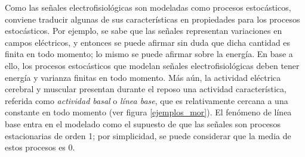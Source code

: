 %

%

Como las señales electrofisiológicas son modeladas como procesos estocásticos, conviene traducir algunas de sus características en propiedades para los procesos estocásticos.
%
Por ejemplo, se sabe que las señales representan variaciones en campos eléctricos, y entonces se puede afirmar sin duda que dicha cantidad es finita en todo momento; lo mismo se puede afirmar sobre la energía.
%
En base a ello, los procesos estocásticos que modelan señales electrofisiológicas deben tener energía y varianza finitas en todo momento.
%
%
%
%
Más aún, la actividad eléctrica cerebral y muscular presentan durante el reposo una actividad característica, referida como \textit{actividad basal} o \textit{línea base}, que es relativamente cercana a una constante en todo momento (ver figura \ref{ejemplos_mor}).
%
El fenómeno de línea base entra en el modelado como el supuesto de que las señales son procesos estacionarias de orden 1; por simplicidad, se puede considerar que la media de estos procesos es 0.

